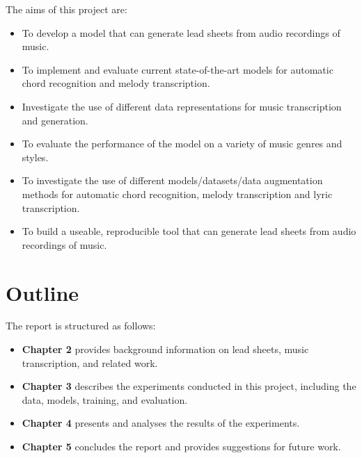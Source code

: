 The aims of this project are:
\begin{itemize}
    \item To develop a model that can generate lead sheets from audio recordings of music.
    \item To implement and evaluate current state-of-the-art models for automatic chord recognition and melody transcription.
    \item Investigate the use of different data representations for music transcription and generation.
    \item To evaluate the performance of the model on a variety of music genres and styles.
    \item To investigate the use of different models/datasets/data augmentation methods for automatic chord recognition, melody transcription and lyric transcription.
    \item To build a useable, reproducible tool that can generate lead sheets from audio recordings of music.
\end{itemize}

\section{Outline}

The report is structured as follows:

\begin{itemize}
    \item \textbf{Chapter 2} provides background information on lead sheets, music transcription, and related work.
    \item \textbf{Chapter 3} describes the experiments conducted in this project, including the data, models, training, and evaluation.
    \item \textbf{Chapter 4} presents and analyses the results of the experiments.
    \item \textbf{Chapter 5} concludes the report and provides suggestions for future work.
\end{itemize}